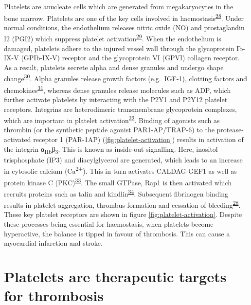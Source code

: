 \documentclass[11pt,twoside]{bristolthesis}
\begin{document}
Platelets are anucleate cells which are generated from megakaryocytes in the bone marrow. Platelets are one of the key cells involved in haemostasis\textsuperscript{\protect\hyperlink{ref-Rivera2009}{28}}. Under normal conditions, the endothelium releases nitric oxide (NO) and prostaglandin I2 (PGI2) which suppress platelet activation\textsuperscript{\protect\hyperlink{ref-Yau2015}{29}}. When the endothelium is damaged, platelets adhere to the injured vessel wall through the glycoprotein Ib-IX-V (GPIb-IX-V) receptor and the glycoprotein VI (GPVI) collagen receptor. As a result, platelets secrete alpha and dense granules and undergo shape change\textsuperscript{\protect\hyperlink{ref-Badimon2012}{30}}. Alpha granules release growth factors (e.g.~IGF-1), clotting factors and chemokines\textsuperscript{\protect\hyperlink{ref-Gear2003}{31}}, whereas dense granules release molecules such as ADP, which further activate platelets by interacting with the P2Y1 and P2Y12 platelet receptors. Integrins are heterodimeric transmembrane glycoprotein complexes, which are important in platelet activation\textsuperscript{\protect\hyperlink{ref-Durrant2017a}{32}}. Binding of agonists such as thrombin (or the synthetic peptide agonist PAR1-AP/TRAP-6) to the protease-activated receptor 1 (PAR-1AP) (\ref{fig:platelet-activation}) results in activation of the integrin α\textsubscript{IIb}β\textsubscript{3}. This is known as inside-out signalling. Here, inositol trisphosphate (IP3) and diacylglycerol are generated, which leads to an increase in cytosolic calcium (Ca\textsuperscript{2+}). This in turn activates CALDAG-GEF1 as well as protein kinase C (PKC)\textsuperscript{\protect\hyperlink{ref-Mehrbod2013}{33}}. The small GTPase, Rap1 is then activated which recruits proteins such as talin and kindlin\textsuperscript{\protect\hyperlink{ref-Durrant2017}{34}}. Subsequent fibrinogen binding results in platelet aggregation, thrombus formation and cessation of bleeding\textsuperscript{\protect\hyperlink{ref-Rivera2009}{28}}. These key platelet receptors are shown in figure \ref{fig:platelet-activation}. Despite these processes being essential for haemostasis, when platelets become hyperactive, the balance is tipped in favour of thrombosis. This can cause a myocardial infarction and stroke.




\hypertarget{platelets-are-therapeutic-targets-for-thrombosis}{%
\section{Platelets are therapeutic targets for thrombosis}\label{platelets-are-therapeutic-targets-for-thrombosis}}
\end{document}
